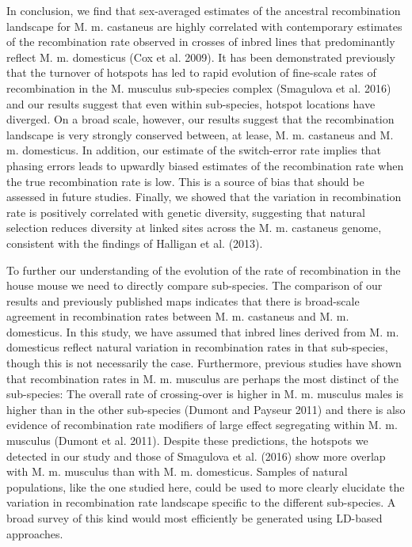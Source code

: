 In conclusion, we find that sex-averaged estimates of the ancestral recombination landscape for M. m. castaneus are highly correlated with contemporary estimates of the recombination rate observed in crosses of inbred lines that predominantly reflect M. m. domesticus (Cox et al. 2009). It has been demonstrated previously that the turnover of hotspots has led to rapid evolution of fine-scale rates of recombination in the M. musculus sub-species complex (Smagulova et al. 2016) and our results suggest that even within sub-species, hotspot locations have diverged. On a broad scale, however, our results suggest that the recombination landscape is very strongly conserved between, at lease, M. m. castaneus and M. m. domesticus. In addition, our estimate of the switch-error rate implies that phasing errors leads to upwardly biased estimates of the recombination rate when the true recombination rate is low. This is a source of bias that should be assessed in future studies. Finally, we showed that the variation in recombination rate is positively correlated with genetic diversity, suggesting that natural selection reduces diversity at linked sites across the M. m. castaneus genome, consistent with the findings of Halligan et al. (2013). 
 
To further our understanding of the evolution of the rate of recombination in the house mouse we need to directly compare sub-species. The comparison of our results and previously published maps indicates that there is broad-scale agreement in recombination rates between M. m. castaneus and M. m. domesticus. In this study, we have assumed that inbred lines derived from M. m. domesticus reflect natural variation in recombination rates in that sub-species, though this is not necessarily the case.  Furthermore, previous studies have shown that recombination rates in M. m. musculus are perhaps the most distinct of the sub-species: The overall rate of crossing-over is higher in M. m. musculus males is higher than in the other sub-species (Dumont and Payseur 2011) and there is also evidence of recombination rate modifiers of large effect segregating within M. m. musculus (Dumont et al. 2011). Despite these predictions, the hotspots we detected in our study and those of Smagulova et al. (2016) show more overlap with M. m. musculus than with M. m. domesticus. Samples of natural populations, like the one studied here, could be used to more clearly elucidate the variation in recombination rate landscape specific to the different sub-species. A broad survey of this kind would most efficiently be generated using LD-based approaches.  
